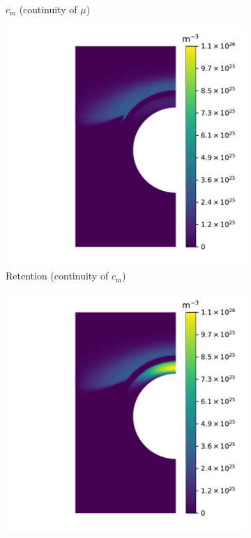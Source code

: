 \begin{figure} [p]
\begin{subfigure}{0.35\linewidth}
        \caption{$c_\mathrm{m}$ (continuity of $\mu$)}
    \end{subfigure}
    \begin{subfigure}{0.35\linewidth}
        \centering
        \includegraphics[width=\linewidth]{Figures/Chapter3/monoblocks/interface_condition/iter case/retention_c.pdf}
        \caption{Retention (continuity of $c_\mathrm{m}$)}
    \end{subfigure}%
    \begin{subfigure}{0.35\linewidth}
        \centering
        \includegraphics[width=\linewidth]{Figures/Chapter3/monoblocks/interface_condition/iter case/retention_mu.pdf}

\end{subfigure}
\end{figure}
